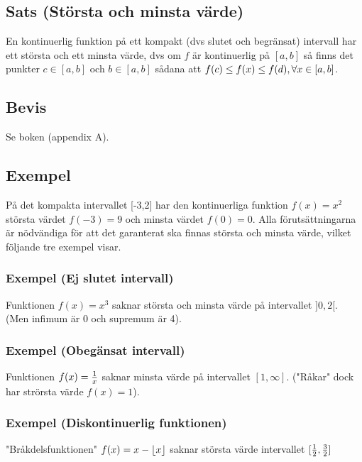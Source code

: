 \documentclass{article}
\begin{document}
\subsection{Sats (Största och minsta värde)}
En kontinuerlig funktion på ett kompakt (dvs slutet och begränsat) intervall
har ett största och ett minsta värde, dvs om $f$ är kontinuerlig på $\left[ a,b\right]$
så finns det punkter $c\in\left[ a,b \right]$ och $b\in\left[ a,b \right]$ sådana att
$f(c)\le f(x)\le f(d), \forall x \in \left[ a,b \right]$.

\subsection{Bevis}
Se boken (appendix A).

\subsection{Exempel}
På det kompakta intervallet [-3,2] har den kontinuerliga funktion $f(x) = x^2$ största värdet $f(-3)=9$ och minsta värdet $f(0)=0$.
Alla förutsättningarna är nödvändiga för att det garanterat ska finnas största och minsta värde, vilket följande tre exempel visar.

\subsubsection{Exempel (Ej slutet intervall)}
Funktionen $f(x)=x^3$ saknar största och minsta värde på intervallet $]0,2[$.
(Men infimum är 0 och supremum är 4).

\subsubsection{Exempel (Obegänsat intervall)}
Funktionen $f(x)=\frac{1}{x}$ saknar minsta värde på intervallet $[1,\infty]$.
("Råkar" dock har strörsta värde $f(x)=1$).

\subsubsection{Exempel (Diskontinuerlig funktionen)}
"Bråkdelsfunktionen" $f(x)=x-\lfloor x\rfloor$ saknar största värde intervallet $[\frac{1}{2}, \frac{3}{2}]$
\end{document}

